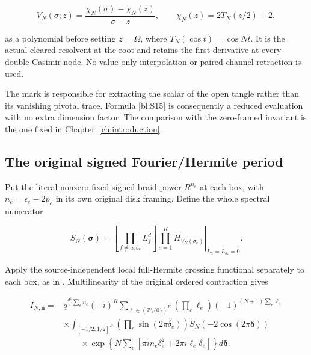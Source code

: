 \begin{equation}\label{bl:S16}
V_N(\sigma;z)=
  \frac{\chi_N(\sigma)-\chi_N(z)}{\sigma-z},\qquad
 \chi_N(z)=2T_N(z/2)+2,
\end{equation}

as a polynomial before setting \(z=\Omega\), where
\(T_N(\cos t)=\cos Nt\). It is the actual cleared resolvent at the root
and retains the first derivative at every double Casimir node. No
value-only interpolation or paired-channel retraction is used.

The mark is responsible for extracting the scalar of the open tangle
rather than its vanishing pivotal trace. Formula \eqref{bl:S15}
is consequently a reduced evaluation with no extra dimension factor.
The comparison with the zero-framed invariant is the one fixed in
Chapter~\ref{ch:introduction}.

\subsection{The original signed Fourier/Hermite period}\label{bl:the-original-signed-fourierhermite-period}

Put the literal nonzero fixed signed braid power \(R^{n_e}\) at each box, with \(n_e=\epsilon_e-2p_e\) in its own original disk framing. Define the whole spectral numerator

\begin{equation}\label{bl:S17}
S_N(\boldsymbol\sigma)=
 \left[\prod_{f\ne a,b_*}L_f^d\right]
 \left.\prod_{e=1}^{R}H_{V_N(\sigma_e)}\right|_{L_a=L_{b_*}=0}.
\end{equation}

Apply the source-independent local full-Hermite crossing functional
separately to each box, as in \cite[Corollary~9.2]{Finite}.
Multilinearity of the original ordered contraction gives

\begin{equation}\label{bl:S18}
\begin{split}
 I_{N,\boldsymbol n}={}&
 q^{\frac{d^2}{4}\sum_e n_e}(-i)^{R}
 \sum_{\boldsymbol\ell\in(\mathbb Z\setminus\{0\})^{R}}
 \left(\prod_e\ell_e\right)(-1)^{(N+1)\sum_e\ell_e}\\
 &\times\int_{[-1/2,1/2]^{R}}
 \left(\prod_e\sin(2\pi\delta_e)\right)
 S_N(-2\cos(2\pi\boldsymbol\delta))\\
 &\qquad\times
 \exp\!\left\{N\sum_e[\pi i n_e\delta_e^2+2\pi i\ell_e\delta_e]\right\}
 d\boldsymbol\delta .
 \end{split}
\end{equation}

